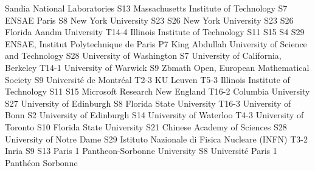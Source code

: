 \begin{multicols}{2}
{Sandia National Laboratories}
{S13}
{}
{}
{}
{}
{}
{}
{Massachusetts Institute of Technology}
{S7}
{}
{}
{}
{}
{}
{}
{ENSAE Paris}
{S8}
{}
{}
{}
{}
{}
{}
{New York University}
{S23}
{S26}
{}
{}
{}
{}
{}
{New York University}
{S23}
{S26}
{}
{}
{}
{}
{}
{Florida Aandm University}
{T14-4}
{}
{}
{}
{}
{}
{}
{Illinois Institute of Technology}
{S11}
{S15}
{S4}
{S29}
{}
{}
{}
{ENSAE, Institut Polytechnique de Paris}
{P7}
{}
{}
{}
{}
{}
{}
{King Abdullah University of Science and Technology}
{S28}
{}
{}
{}
{}
{}
{}
{University of Washington}
{S7}
{}
{}
{}
{}
{}
{}
{University of California, Berkeley}
{T14-1}
{}
{}
{}
{}
{}
{}
{University of Warwick}
{S9}
{}
{}
{}
{}
{}
{}
{Zbmath Open, European Mathematical Society}
{S9}
{}
{}
{}
{}
{}
{}
{Universit\'e de Montr\'eal}
{T2-3}
{}
{}
{}
{}
{}
{}
{KU Leuven}
{T5-3}
{}
{}
{}
{}
{}
{}
{Illinois Institute of Technology}
{S11}
{S15}
{}
{}
{}
{}
{}
{Microsoft Research New England}
{T16-2}
{}
{}
{}
{}
{}
{}
{Columbia University}
{S27}
{}
{}
{}
{}
{}
{}
{University of Edinburgh}
{S8}
{}
{}
{}
{}
{}
{}
{Florida State University}
{T16-3}
{}
{}
{}
{}
{}
{}
{University of Bonn}
{S2}
{}
{}
{}
{}
{}
{}
{University of Edinburgh}
{S14}
{}
{}
{}
{}
{}
{}
{University of Waterloo}
{T4-3}
{}
{}
{}
{}
{}
{}
{University of Toronto}
{S10}
{}
{}
{}
{}
{}
{}
{Florida State University}
{S21}
{}
{}
{}
{}
{}
{}
{Chinese Academy of Sciences}
{S28}
{}
{}
{}
{}
{}
{}
{University of Notre Dame}
{S29}
{}
{}
{}
{}
{}
{}
{Istituto Nazionale di Fisica Nucleare (INFN)}
{T3-2}
{}
{}
{}
{}
{}
{}
{Inria}
{S9}
{S13}
{}
{}
{}
{}
{}
{Paris 1 Pantheon-Sorbonne University}
{S8}
{}
{}
{}
{}
{}
{}
{Universit\'e Paris 1 Panth\'eon Sorbonne}

\end{multicols}
